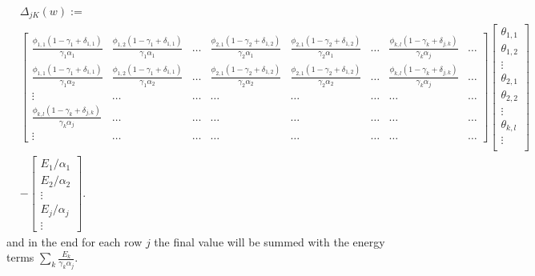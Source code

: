 \documentclass[12pt]{article}
\begin{document}
\begin{equation}
    \label{eq:delta_matrix}
    \begin{split}
        &\Delta_{jK}(w) := \\
        &\begin{bmatrix}
            \frac{\phi_{1,1}(1-\gamma_1 + \delta_{1,1})}{\gamma_1\alpha_1} & \frac{\phi_{1,2}(1-\gamma_1+ \delta_{1,1})}{\gamma_1\alpha_1} & \dots & \frac{\phi_{2,1}(1-\gamma_2+ \delta_{1,2})}{\gamma_2\alpha_1} & \frac{\phi_{2,1}(1-\gamma_2+ \delta_{1,2})}{\gamma_2\alpha_1} & \dots & \frac{\phi_{k,l}(1-\gamma_k+ \delta_{j,k})}{\gamma_k\alpha_j} & \dots \\
            \frac{\phi_{1,1}(1-\gamma_1 + \delta_{1,1})}{\gamma_1\alpha_2} & \frac{\phi_{1,2}(1-\gamma_1+ \delta_{1,1})}{\gamma_1\alpha_2} & \dots & \frac{\phi_{2,1}(1-\gamma_2+ \delta_{1,2})}{\gamma_2\alpha_2} & \frac{\phi_{2,1}(1-\gamma_2+ \delta_{1,2})}{\gamma_2\alpha_2} & \dots & \frac{\phi_{k,l}(1-\gamma_k+ \delta_{j,k})}{\gamma_k\alpha_j} & \dots \\
            \vdots & \dots & \dots & \dots & \dots & \dots & \dots & \dots \\
            \frac{\phi_{k,l}(1-\gamma_k+ \delta_{j,k})}{\gamma_k\alpha_j} & \dots & \dots & \dots & \dots & \dots & \dots & \dots\\
            \vdots & \dots & \dots & \dots & \dots & \dots & \dots & \dots
        \end{bmatrix}
        \begin{bmatrix}
            \theta_{1,1} \\
            \theta_{1,2} \\
            \vdots \\
            \theta_{2,1} \\
            \theta_{2,2} \\
            \vdots \\
            \theta_{k,l} \\
            \vdots \\
        \end{bmatrix}\\
        &-
        \begin{bmatrix}
            E_1/\alpha_1 \\
            E_2/\alpha_2 \\
            \vdots \\
            E_j/\alpha_j \\
            \vdots
        \end{bmatrix}
        .
    \end{split}
\end{equation}
and in the end for each row $j$ the final value will be summed with the energy terms $\sum_k \frac{E_k}{\gamma_k\alpha_j}$.
\fi
\end{document}
